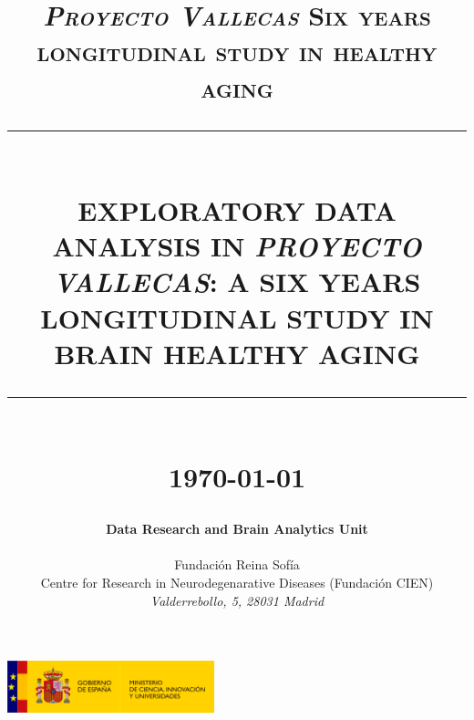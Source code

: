 \documentclass[11pt]{article}
\theoremstyle{definition}
\theoremstyle{remark}
\newcommand{\HRule}[1]{\rule{\linewidth}{#1}}
\begin{document}

\title{ \normalsize \textsc{\emph{Proyecto Vallecas} Six years longitudinal study in healthy aging}
    \\ [2.0cm]
    \HRule{0.5pt} \\
    \LARGE \textbf{\uppercase{Exploratory Data Analysis in \emph{Proyecto Vallecas}: a six years longitudinal study in brain healthy aging}}
    \HRule{2pt} \\ [0.5cm]
    \normalsize \today \vspace*{5\baselineskip}}

\date{ }
\author{
    \textbf{\large{Data Research and Brain Analytics Unit}}   \\  \\
    \large{Fundaci\'on Reina Sof\'ia} \\
    Centre for Research in Neurodegenarative Diseases (Fundaci\'on CIEN)
    \\ \emph{Valderrebollo, 5, 28031 Madrid}
 }


\maketitle
\begin{center}
\includegraphics[width = 60mm]{figures/logo_mciu.png}
\end{center}
\newpage
\tableofcontents
\newpage

\sectionfont{\scshape}
\end{document}
